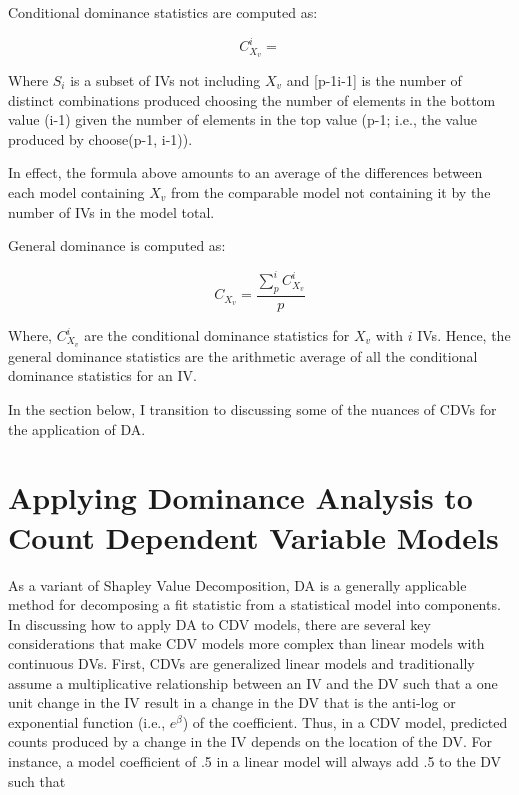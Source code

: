 \documentclass[ShortAfour,times,sageapa]{sagej}
\begin{document}
	Conditional dominance statistics are computed as:
	
	\begin{equation}
		C^{i}_{X_v} =
	\end{equation}
	
	Where $S_i$ is a subset of IVs not including $X_v$ and [p-1i-1] is the number of distinct combinations produced choosing the number of elements in the bottom value (i-1) given the number of elements in the top value (p-1; i.e., the value produced by choose(p-1, i-1)).
	
	In effect, the formula above amounts to an average of the differences between each model containing $X_v$ from the comparable model not containing it by the number of IVs in the model total.
	
	General dominance is computed as:
	
	\begin{equation}
		C_{X_v} = \frac{\sum_{p}^{i} C^{i}_{X_v}}{p}
	\end{equation}
	
	Where, $C^{i}_{X_v}$ are the conditional dominance statistics for $X_v$ with $i$ IVs. 
	Hence, the general dominance statistics are the arithmetic average of all the conditional dominance statistics for an IV.
	
	In the section below, I transition to discussing some of the nuances of CDVs for the application of DA.
	
\section{Applying Dominance Analysis to Count Dependent Variable Models}

	As a variant of Shapley Value Decomposition, DA is a generally applicable method for decomposing a fit statistic from a statistical model into components.
	In discussing how to apply DA to CDV models, there are several key considerations that make CDV models more complex than linear models with continuous DVs.  
	First, CDVs are generalized linear models and traditionally assume a multiplicative relationship between an IV and the DV such that a one unit change in the IV result in a change in the DV that is the anti-log or exponential function (i.e., $e^{\beta}$) of the coefficient.  
	Thus, in a CDV model, predicted counts produced by a change in the IV depends on the location of the DV.  
	For instance, a model coefficient of .5 in a linear model will always add .5 to the DV such that 
	
\end{document}
